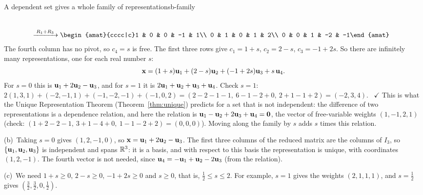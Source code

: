 \documentclass[11pt]{article}
\begin{document}
\begin{exmp}{A dependent set gives a whole family of representations}{b-family}
\begin{align*}
\\[4pt]
&\rops{R_1+R_3}
\begin{amat}{cccc|c}1 & 0 & 0 & -1 & 1\\ 0 & 1 & 0 & 1 & 2\\ 0 & 0 & 1 & -2 & -1\end{amat}
\end{align*}
The fourth column has no pivot, so $c_4=s$ is free. The first three rows give $c_1=1+s$, $c_2=2-s$, $c_3=-1+2s$. So there are infinitely many representations, one for each real number $s$:
\[
\mathbf{x}=(1+s)\mathbf{u}_1+(2-s)\mathbf{u}_2+(-1+2s)\mathbf{u}_3+s\,\mathbf{u}_4 .
\]
For $s=0$ this is $\mathbf{u}_1+2\mathbf{u}_2-\mathbf{u}_3$, and for $s=1$ it is $2\mathbf{u}_1+\mathbf{u}_2+\mathbf{u}_3+\mathbf{u}_4$. Check $s=1$: $2(1,3,1)+(-2,-1,1)+(-1,-2,-1)+(-1,0,2)=(2-2-1-1,\ 6-1-2+0,\ 2+1-1+2)=(-2,3,4)$. \ $\checkmark$ This is what the Unique Representation Theorem (Theorem~\ref{thm:unique}) predicts for a set that is not independent: the difference of two representations is a dependence relation, and here the relation is $\mathbf{u}_1-\mathbf{u}_2+2\mathbf{u}_3+\mathbf{u}_4=\mathbf{0}$, the vector of free-variable weights $(1,-1,2,1)$ (check: $(1+2-2-1,\ 3+1-4+0,\ 1-1-2+2)=(0,0,0)$). Moving along the family by $s$ adds $s$ times this relation.

(b)~Taking $s=0$ gives $(1,2,-1,0)$, so $\mathbf{x}=\mathbf{u}_1+2\mathbf{u}_2-\mathbf{u}_3$. The first three columns of the reduced matrix are the columns of $I_3$, so $\{\mathbf{u}_1,\mathbf{u}_2,\mathbf{u}_3\}$ is independent and spans $\mathbb{R}^3$: it is a basis, and with respect to this basis the representation is unique, with coordinates $(1,2,-1)$. The fourth vector is not needed, since $\mathbf{u}_4=-\mathbf{u}_1+\mathbf{u}_2-2\mathbf{u}_3$ (from the relation).

(c)~We need $1+s\ge0$, $2-s\ge0$, $-1+2s\ge0$ and $s\ge0$, that is, $\tfrac12\le s\le2$. For example, $s=1$ gives the weights $(2,1,1,1)$, and $s=\tfrac12$ gives $(\tfrac32,\tfrac32,0,\tfrac12)$.
\end{exmp}
\end{document}
